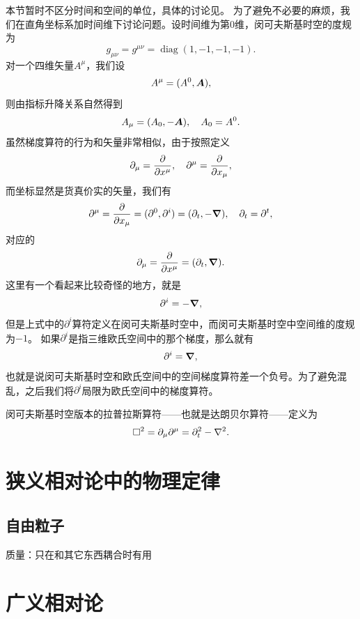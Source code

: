 \documentclass[hyperref, UTF8, a4paper]{ctexart}
\DeclareMathOperator{\diag}{diag}
\begin{document}
本节暂时不区分时间和空间的单位，具体的讨论见。
为了避免不必要的麻烦，我们在直角坐标系加时间维下讨论问题。设时间维为第$0$维，闵可夫斯基时空的度规为
\begin{equation}
    g_{\mu \nu} = g^{\mu \nu} = \diag(1, -1, -1, -1).
\end{equation}
对一个四维矢量$A^\mu$，我们设
\begin{equation}
    A^\mu = (A^0, \vb*{A}),
\end{equation}
则由指标升降关系自然得到
\begin{equation}
    A_\mu = (A_0, -\vb*{A}), \quad A_0 = A^0.
\end{equation}
虽然梯度算符的行为和矢量非常相似，由于按照定义
\[
    \partial_\mu = \pdv{x^\mu}, \quad \partial^\mu = \pdv{x_\mu},
\]
而坐标显然是货真价实的矢量，我们有
\begin{equation}
    \partial^\mu = \pdv{x_\mu} = (\partial^0, \partial^i) = (\partial_t, - \grad), \quad \partial_t = \partial^t,
\end{equation}
对应的
\begin{equation}
    \partial_\mu = \pdv{x^\mu} = (\partial_t, \grad).
\end{equation}
这里有一个看起来比较奇怪的地方，就是
\[
    \partial^i = - \grad,
\]
但是上式中的$\partial^i$算符定义在闵可夫斯基时空中，而闵可夫斯基时空中空间维的度规为$-1$。
如果$\partial^i$是指三维欧氏空间中的那个梯度，那么就有
\[
    \partial^i = \grad,
\]
也就是说闵可夫斯基时空和欧氏空间中的空间梯度算符差一个负号。为了避免混乱，之后我们将$\partial^i$局限为欧氏空间中的梯度算符。

闵可夫斯基时空版本的拉普拉斯算符——也就是达朗贝尔算符——定义为
\begin{equation}
    \Box^2 = \partial_\mu \partial^\mu = \partial_t^2 - \laplacian.
\end{equation}

\section{狭义相对论中的物理定律}

\subsection{自由粒子}

质量：只在和其它东西耦合时有用

\section{广义相对论}
\end{document}
